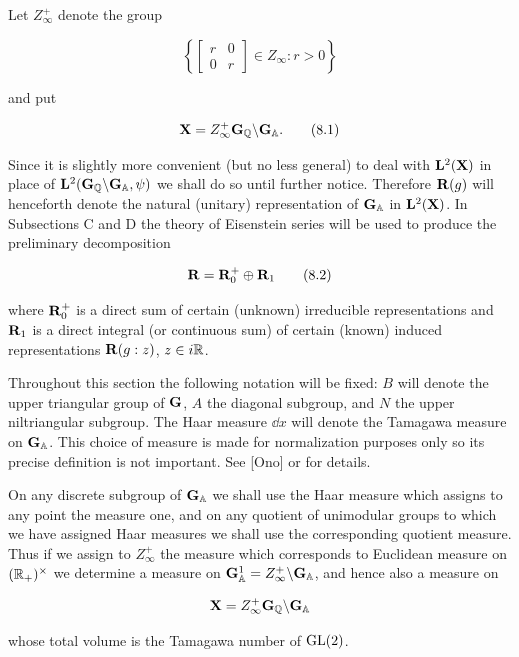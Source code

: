 Let $Z_{\infty}^{+}$ denote the group

\[
\left\{\begin{bmatrix} r & 0 \\ 0 & r \end{bmatrix} \in Z_{\infty}: r > 0\right\}
\]

and put

\begin{equation}\label{eq:8.1}
\mathbf{X} = Z_{\infty}^{+}\mathbf{G}_{\mathbb{Q}}\backslash\mathbf{G}_{\mathbb{A}}.\tag{8.1}
\end{equation}

Since it is slightly more convenient (but no less general) to deal with $\mathbf{L}^{2}(\mathbf{X})$ in place of $\mathbf{L}^{2}(\mathbf{G}_{\mathbb{Q}}\backslash\mathbf{G}_{\mathbb{A}},\psi)$ we shall do so until further notice. Therefore $\mathbf{R}(g)$ will henceforth denote the natural (unitary) representation of $\mathbf{G}_{\mathbb{A}}$ in $\mathbf{L}^{2}(\mathbf{X})$. In Subsections C and D the theory of Eisenstein series will be used to produce the preliminary decomposition

\begin{equation}\label{eq:8.2}
\mathbf{R} = \mathbf{R}_{0}^{+}\oplus\mathbf{R}_{1}\tag{8.2}
\end{equation}

where $\mathbf{R}_{0}^{+}$ is a direct sum of certain (unknown) irreducible representations and $\mathbf{R}_{1}$ is a direct integral (or continuous sum) of certain (known) induced representations $\mathbf{R}(g:z)$, $z \in i\mathbb{R}$.

Throughout this section the following notation will be fixed: $B$ will denote the upper triangular group of $\mathbf{G}$, $A$ the diagonal subgroup, and $N$ the upper niltriangular subgroup. The Haar measure $\dd x$ will denote the Tamagawa measure on $\mathbf{G}_{\mathbb{A}}$. This choice of measure is made for normalization purposes only so its precise definition is not important. See [Ono] or \cite{Weil6} for details.

On any discrete subgroup of $\mathbf{G}_{\mathbb{A}}$ we shall use the Haar measure which assigns to any point the measure one, and on any quotient of unimodular groups to which we have assigned Haar measures we shall use the corresponding quotient measure. Thus if we assign to $Z_{\infty}^{+}$ the measure which corresponds to Euclidean measure on $(\mathbb{R}_{+})^{\times}$ we determine a measure on $\mathbf{G}_{\mathbb{A}}^{1} = Z_{\infty}^{+}\backslash\mathbf{G}_{\mathbb{A}}$, and hence also a measure on

\[
\mathbf{X} = Z_{\infty}^{+}\mathbf{G}_{\mathbb{Q}}\backslash\mathbf{G}_{\mathbb{A}}
\]

whose total volume is the Tamagawa number of $\operatorname{GL}(2)$.


